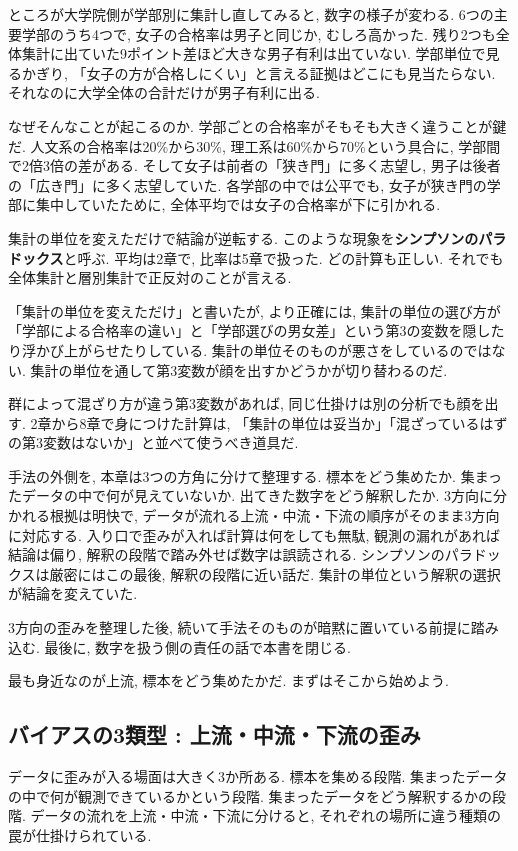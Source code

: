 ところが大学院側が学部別に集計し直してみると, 数字の様子が変わる.
6つの主要学部のうち4つで, 女子の合格率は男子と同じか, むしろ高かった.
残り2つも全体集計に出ていた9ポイント差ほど大きな男子有利は出ていない.
学部単位で見るかぎり, 「女子の方が合格しにくい」と言える証拠はどこにも見当たらない.
それなのに大学全体の合計だけが男子有利に出る.

なぜそんなことが起こるのか.
学部ごとの合格率がそもそも大きく違うことが鍵だ.
人文系の合格率は20\%から30\%, 理工系は60\%から70\%という具合に, 学部間で2倍3倍の差がある.
そして女子は前者の「狭き門」に多く志望し, 男子は後者の「広き門」に多く志望していた.
各学部の中では公平でも, 女子が狭き門の学部に集中していたために, 全体平均では女子の合格率が下に引かれる.

集計の単位を変えただけで結論が逆転する. このような現象を\textbf{シンプソンのパラドックス}と呼ぶ.
平均は2章で, 比率は5章で扱った. どの計算も正しい.
それでも全体集計と層別集計で正反対のことが言える.

「集計の単位を変えただけ」と書いたが, より正確には, 集計の単位の選び方が「学部による合格率の違い」と「学部選びの男女差」という第3の変数を隠したり浮かび上がらせたりしている.
集計の単位そのものが悪さをしているのではない. 集計の単位を通して第3変数が顔を出すかどうかが切り替わるのだ.

群によって混ざり方が違う第3変数があれば, 同じ仕掛けは別の分析でも顔を出す.
2章から8章で身につけた計算は, 「集計の単位は妥当か」「混ざっているはずの第3変数はないか」と並べて使うべき道具だ.

手法の外側を, 本章は3つの方角に分けて整理する.
標本をどう集めたか. 集まったデータの中で何が見えていないか. 出てきた数字をどう解釈したか.
3方向に分かれる根拠は明快で, データが流れる上流・中流・下流の順序がそのまま3方向に対応する.
入り口で歪みが入れば計算は何をしても無駄, 観測の漏れがあれば結論は偏り, 解釈の段階で踏み外せば数字は誤読される.
シンプソンのパラドックスは厳密にはこの最後, 解釈の段階に近い話だ. 集計の単位という解釈の選択が結論を変えていた.

3方向の歪みを整理した後, 続いて手法そのものが暗黙に置いている前提に踏み込む.
最後に, 数字を扱う側の責任の話で本書を閉じる.

最も身近なのが上流, 標本をどう集めたかだ. まずはそこから始めよう.


\subsection{バイアスの3類型 : 上流・中流・下流の歪み}

データに歪みが入る場面は大きく3か所ある.
標本を集める段階. 集まったデータの中で何が観測できているかという段階. 集まったデータをどう解釈するかの段階.
データの流れを上流・中流・下流に分けると, それぞれの場所に違う種類の罠が仕掛けられている.

